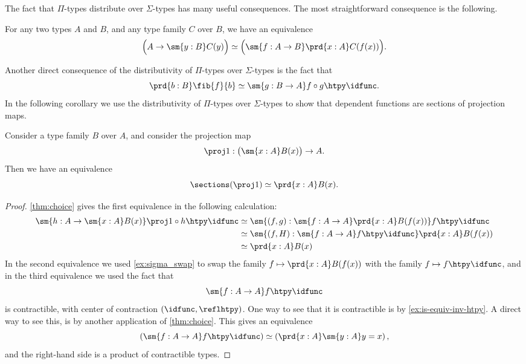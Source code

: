 The fact that $\Pi$-types distribute over $\Sigma$-types has many useful consequences. The most straightforward consequence is the following.

\begin{cor}
  For any two types $A$ and $B$, and any type family $C$ over $B$, we have an equivalence
\begin{equation*}
  \Big(A\to\sm{y:B}C(y)\Big)\simeq\Big(\sm{f:A\to B}\prd{x:A}C(f(x))\Big).
\end{equation*}
\end{cor}

Another direct consequence of the distributivity of $\Pi$-types over $\Sigma$-types is the fact that
\begin{equation*}
  \prd{b:B}\fib{f}{b}\simeq\sm{g:B\to A}f\circ g\htpy \idfunc.
\end{equation*}
In the following corollary we use the distributivity of $\Pi$-types over $\Sigma$-types to show that dependent functions are sections of projection maps.

\begin{cor}\label{ex:pi_sec}
  Consider a type family $B$ over $A$, and consider the projection map
  \begin{equation*}
    \proj 1:\big(\sm{x:A}B(x)\big) \to A.  
  \end{equation*}
  Then we have an equivalence
  \begin{equation*}
    \sections(\proj 1)\simeq\prd{x:A}B(x).
  \end{equation*}
\end{cor}

\begin{proof}
  \cref{thm:choice} gives the first equivalence in the following calculation:
  \begin{align*}
    \sm{h:A\to\sm{x:A}B(x)} \proj 1\circ h\htpy \idfunc
    & \simeq \sm{(f,g):\sm{f:A\to A}\prd{x:A}B(f(x))} f\htpy \idfunc \\
    & \simeq \sm{(f,H):\sm{f:A\to A}f\htpy \idfunc}\prd{x:A}B(f(x)) \\
    & \simeq \prd{x:A}B(x)
  \end{align*}
  In the second equivalence we used \cref{ex:sigma_swap} to swap the family $f\mapsto \prd{x:A}B(f(x))$ with the family $f\mapsto f\htpy\idfunc$, and in the third equivalence we used the fact that
  \begin{equation*}
    \sm{f:A\to A}f\htpy\idfunc
  \end{equation*}
  is contractible, with center of contraction $(\idfunc,\reflhtpy)$. One way to see that it is contractible is by \cref{ex:is-equiv-inv-htpy}. A direct way to see this, is by another application of \cref{thm:choice}. This gives an equivalence
  \begin{equation*}
    \left(\sm{f:A\to A}f\htpy\idfunc\right)\simeq \left(\prd{x:A}\sm{y:A}y=x\right),
  \end{equation*}
  and the right-hand side is a product of contractible types.
\end{proof}

